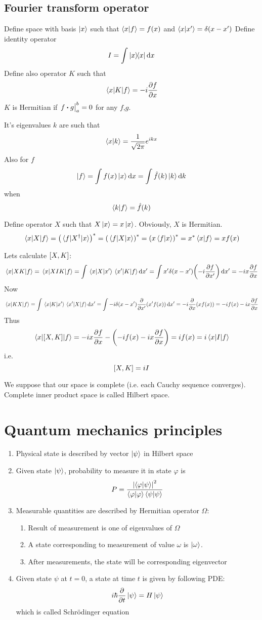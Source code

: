 \subsection{Fourier transform operator}
Define space with basis $\ket{x}$ such that $\braket{x}{f} = f(x)$ and $\braket{x}{x'} = \delta(x-x')$
Define identity operator
$$I = \int \dyad{x}{x} \dd{x}$$
Define also operator $K$ such that
$$\mel{x}{K}{f} = - i\pdv{f}{x}$$
$K$ is Hermitian if $\eval{f \vdot g}_a^b = 0$ for any $f$,$g$.

It's eigenvalues $k$ are such that
$$\braket{x}{k} = \frac{1}{\sqrt{2\pi}} e^{ikx}$$
Also for $f$
$$\ket{f} = \int f(x) \ket{x} \dd{x} = \int \hat{f} (k) \ket{k} \dd{k} $$
when
$$\braket{k}{f} = \hat{f}(k)$$

Define operator $X$ such that $X\ket{x} = x\ket{x}$. Obviously, $X$ is Hermitian.
$$\mel{x}{X}{f} = \qty(\mel{f}{X^\dagger}{x})^* =  \qty(\mel{f}{X}{x})^* = \qty(x\braket{f}{x})^* = x^* \braket{x}{f} = xf(x) $$

Lets calculate $\comm{X}{K}$:
$$\mel{x}{XK}{f} = \mel{x}{XIK}{f} = \int \mel{x}{X}{x'} \mel{x'}{K}{f} \dd{x'} = \int x'\delta(x-x') \qty(-i\pdv{f}{x'}) \dd{x'} = -ix \pdv{f}{x}$$
Now
$$\mel{x}{KX}{f} = \int \mel{x}{K}{x'} \mel{x'}{X}{f} \dd{x'} = \int -i \delta(x-x') \pdv{x'} \qty(x'f(x)) \dd{x'} = -i \pdv{x}\qty(xf(x)) = -if(x) -ix\pdv{f}{x}  $$
Thus
$$\mel{x}{\comm{X}{K}}{f} = -ix\pdv{f}{x} - \qty(-if(x) - ix\pdv{f}{x}) = if(x) = i\mel{x}{I}{f}$$
i.e.
$$\comm{X}{K} = iI$$

We suppose that our space is complete (i.e. each Cauchy sequence converges). Complete inner product space is called Hilbert space.

\section{Quantum mechanics principles}
\begin{enumerate}
	\item Physical state is described by vector $\ket{\psi}$ in Hilbert space
	\item Given state $\ket{\psi}$, probability to measure it in state $\varphi$ is
	$$P = \frac{\abs{\braket{\varphi}{\psi}}^2}{\braket{\varphi}{\varphi} \braket{\psi}{\psi}}$$
	\item Measurable quantities are described by Hermitian operator $\Omega$:
	\begin{enumerate}
		\item Result of measurement is one of eigenvalues of $\Omega$
		\item A state corresponding to measurement of value $\omega$ is $\ket{\omega}$.
		\item After measurements, the state will be corresponding eigenvector
	\end{enumerate} 
	\item Given state $\psi$ at $t=0$, a state at time $t$ is given by following PDE:
	$$i\hbar \pdv{t} \ket{\psi}  = H\ket{\psi}$$ 
	which is called Schr\"{o}dinger equation
\end{enumerate}

